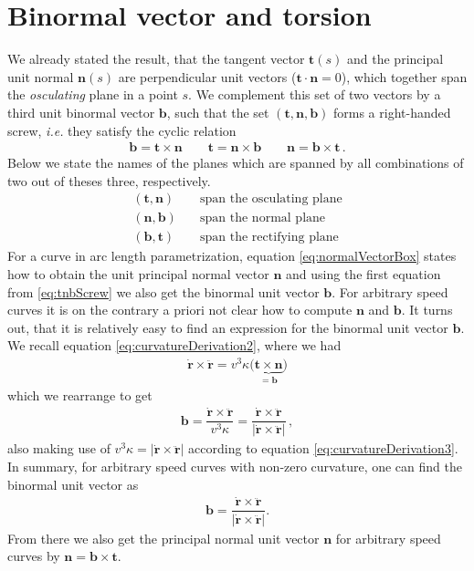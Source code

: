 \documentclass[11pt, DINA4, fleqn]{amsart}
\def\vr{\boldsymbol{r}\xspace}
\def\vrd{\dot{\vr}\xspace}
\def\vrdd{\ddot{\vr}\xspace}
\def\vt{\boldsymbol{t}\xspace}
\def\vn{\boldsymbol{n}\xspace}
\def\vb{\boldsymbol{b}\xspace}
\begin{document}
\section{Binormal vector and torsion}
We already stated the result, that the tangent vector $\vt(s)$ and the principal unit normal $\vn(s)$ are perpendicular unit vectors ($\vt\cdot\vn = 0$), which together span the \emph{osculating} plane in a point $s$. We complement this set of two vectors by a third unit binormal vector $\vb$, such that the set
$(\vt, \vn, \vb)$ forms a right-handed screw, \textit{i.e.} they satisfy the cyclic relation
\begin{align}
\vb = \vt \times \vn \qquad \vt = \vn \times \vb \qquad \vn = \vb \times \vt \, .
\label{eq:tnbScrew}
\end{align}
Below we state the names of the planes which are spanned by all combinations of two out of theses three, respectively.
\begin{align}
(\vt, \vn) \quad &\text{span the osculating plane} \\
(\vn, \vb) \quad &\text{span the normal plane} \\
(\vb, \vt) \quad &\text{span the rectifying plane}
\end{align}
For a curve in arc length parametrization, equation \eqref{eq:normalVectorBox} states how to obtain the unit principal normal vector $\vn$ and using the first equation from \eqref{eq:tnbScrew} we also get the binormal unit vector $\vb$. For arbitrary speed curves it is on the contrary a priori not clear how to compute $\vn$ and $\vb$.
It turns out, that it is relatively easy to find an expression for the binormal unit vector $\vb$.
We recall equation \eqref{eq:curvatureDerivation2}, where we had
\begin{align}
\vrd \times \vrdd
= v^3\kappa \biggl(\underbrace{\vt \times \vn}_{=\vb} \biggl)
\end{align}
which we rearrange to get
\begin{align}
\vb = \dfrac{\vrd \times \vrdd}{v^3 \kappa} = \dfrac{\vrd \times \vrdd}{|\vrd \times \vrdd|} \, ,
\end{align}
also making use of $v^3\kappa = |\vrd\times\vrdd|$ according to equation \eqref{eq:curvatureDerivation3}.
In summary, for arbitrary speed curves with non-zero curvature, one can find the binormal unit vector as
\begin{align}
\vb = \dfrac{\vrd \times \vrdd}{|\vrd \times \vrdd|}.
\end{align}
From there we also get the principal normal unit vector $\vn$ for arbitrary speed curves
by $\vn = \vb \times \vt$.
\end{document}
